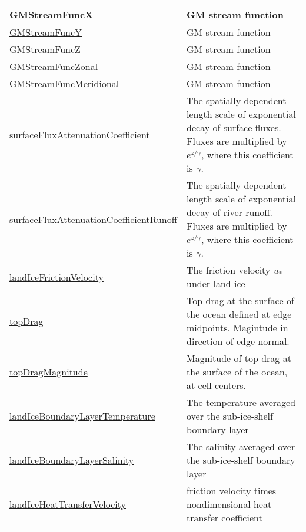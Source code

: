 {\begin{center}
\begin{longtable}{| p{2.0in} | p{4.0in} |}
    \hline
    \hyperref[subsec:var_sec_diagnostics_GMStreamFuncX]{GMStreamFuncX} & GM stream function \\
    \hline
    \hyperref[subsec:var_sec_diagnostics_GMStreamFuncY]{GMStreamFuncY} & GM stream function \\
    \hline
    \hyperref[subsec:var_sec_diagnostics_GMStreamFuncZ]{GMStreamFuncZ} & GM stream function \\
    \hline
    \hyperref[subsec:var_sec_diagnostics_GMStreamFuncZonal]{GMStreamFuncZonal} & GM stream function \\
    \hline
    \hyperref[subsec:var_sec_diagnostics_GMStreamFuncMeridional]{GMStreamFuncMeridional} & GM stream function \\
    \hline
    \hyperref[subsec:var_sec_diagnostics_surfaceFluxAttenuationCoefficient]{surfaceFluxAttenuation\-Coefficient} & The spatially-dependent length scale of exponential decay of surface fluxes. Fluxes are multiplied by $e^{z/\gamma}$, where this coefficient is $\gamma$. \\
    \hline
    \hyperref[subsec:var_sec_diagnostics_surfaceFluxAttenuationCoefficientRunoff]{surfaceFluxAttenuation\-CoefficientRunoff} & The spatially-dependent length scale of exponential decay of river runoff. Fluxes are multiplied by $e^{z/\gamma}$, where this coefficient is $\gamma$. \\
    \hline
    \hyperref[subsec:var_sec_diagnostics_landIceFrictionVelocity]{landIceFrictionVelocity} & The friction velocity $u_*$ under land ice \\
    \hline
    \hyperref[subsec:var_sec_diagnostics_topDrag]{topDrag} & Top drag at the surface of the ocean defined at edge midpoints. Magintude in direction of edge normal. \\
    \hline
    \hyperref[subsec:var_sec_diagnostics_topDragMagnitude]{topDragMagnitude} & Magnitude of top drag at the surface of the ocean, at cell centers. \\
    \hline
    \hyperref[subsec:var_sec_diagnostics_landIceBoundaryLayerTemperature]{landIceBoundaryLayer\-Temperature} & The temperature averaged over the sub-ice-shelf boundary layer \\
    \hline
    \hyperref[subsec:var_sec_diagnostics_landIceBoundaryLayerSalinity]{landIceBoundaryLayerSalinity} & The salinity averaged over the sub-ice-shelf boundary layer \\
    \hline
    \hyperref[subsec:var_sec_diagnostics_landIceHeatTransferVelocity]{landIceHeatTransferVelocity} & friction velocity times nondimensional heat transfer coefficient \\

\end{longtable}
\end{center}}
